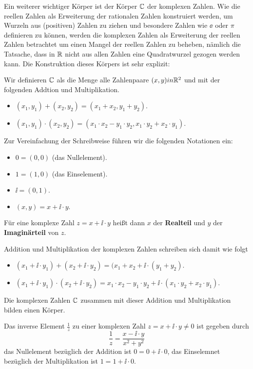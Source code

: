 Ein weiterer wichtiger Körper ist der Körper $\mathbb C$ der komplexen Zahlen. 
Wie die reellen Zahlen als Erweiterung der 
rationalen Zahlen konstruiert werden, um Wurzeln aus (positiven) Zahlen zu ziehen und besondere Zahlen wie $\ee$ 
oder $\pi$ definieren zu können, werden die komplexen Zahlen als Erweiterung der reellen Zahlen betrachtet um einen 
Mangel der reellen Zahlen zu beheben, nämlich die Tatsache, dass in $\mathbb R$ nicht aus allen Zahlen eine Quadratwurzel 
gezogen werden kann. Die Konstruktion dieses Körpers ist sehr explizit: 

Wir definieren $\mathbb C$ als die Menge alle Zahlenpaare $(x,y) \\in \mathbb R^2$ und mit der folgenden Addtion 
und Multiplikation.

\begin{itemize}
\item $(x_1, y_1) + (x_2, y_2) = (x_1+x_2, y_1+y_2)$. 
\item $(x_1,y_1) \cdot (x_2,y_2) = (x_1 \cdot x_2 - y_1 \cdot y_2, x_1 \cdot y_2 + x_2 \cdot y_1)$. 
\end{itemize}

Zur Vereinfachung der Schreibweise führen wir die folgenden Notationen ein: 

\begin{itemize}
\item[] $0 = (0,0)$ (das Nullelement).
\item[] $1 = (1,0)$ (das Einselement). 
\item[] $\ii = (0,1)$. 
\item[] $(x,y) = x+\ii \cdot y$. 
\end{itemize}

Für eine komplexe Zahl $z = x+\ii \cdot y$ heißt dann $x$ der \textbf{Realteil} und $y$ der 
\textbf{Imaginärteil} von $z$. 

Addition und Multiplikation der komplexen Zahlen schreiben sich damit wie folgt

\begin{itemize}
\item $(x_1 + \ii \cdot y_1) + (x_2+ \ii \cdot y_2) =(x_1+x_2 + \ii \cdot (y_1+y_2)$. 
\item $(x_1 + \ii \cdot y_1) \cdot (x_2 + \ii \cdot y_2) 
= x_1 \cdot x_2 - y_1 \cdot y_2 + \ii \cdot (x_1 \cdot y_2 + x_2 \cdot y_1)$. 
\end{itemize}

\medbreak

\begin{satz}
Die komplexen Zahlen $\mathbb C$ zusammen mit dieser Addition und Multiplikation bilden einen Körper. 

Das inverse Element $\frac {1}{z}$ zu einer komplexen Zahl $z = x + \ii \cdot y \neq 0$ ist gegeben durch 
	$$ \frac {1}{z} = \frac {x - \ii \cdot y}{x^2+y^2} $$
das Nullelement bezüglich der Addition ist $0 = 0 + \ii \cdot 0$, das Einselemnet bezüglich der Multiplikation 
ist $1 = 1 + \ii \cdot 0$.  
\end{satz}

